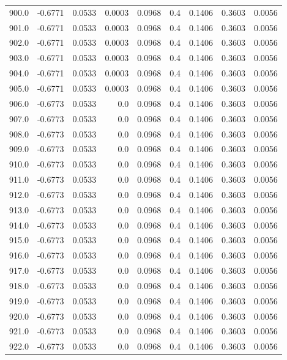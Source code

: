 \begin{longtable}{lrrrrrrrr}
900.0 & -0.6771 & 0.0533 & 0.0003 & 0.0968 & 0.4 & 0.1406 & 0.3603 & 0.0056 \\
901.0 & -0.6771 & 0.0533 & 0.0003 & 0.0968 & 0.4 & 0.1406 & 0.3603 & 0.0056 \\
902.0 & -0.6771 & 0.0533 & 0.0003 & 0.0968 & 0.4 & 0.1406 & 0.3603 & 0.0056 \\
903.0 & -0.6771 & 0.0533 & 0.0003 & 0.0968 & 0.4 & 0.1406 & 0.3603 & 0.0056 \\
904.0 & -0.6771 & 0.0533 & 0.0003 & 0.0968 & 0.4 & 0.1406 & 0.3603 & 0.0056 \\
905.0 & -0.6771 & 0.0533 & 0.0003 & 0.0968 & 0.4 & 0.1406 & 0.3603 & 0.0056 \\
906.0 & -0.6773 & 0.0533 & 0.0 & 0.0968 & 0.4 & 0.1406 & 0.3603 & 0.0056 \\
907.0 & -0.6773 & 0.0533 & 0.0 & 0.0968 & 0.4 & 0.1406 & 0.3603 & 0.0056 \\
908.0 & -0.6773 & 0.0533 & 0.0 & 0.0968 & 0.4 & 0.1406 & 0.3603 & 0.0056 \\
909.0 & -0.6773 & 0.0533 & 0.0 & 0.0968 & 0.4 & 0.1406 & 0.3603 & 0.0056 \\
910.0 & -0.6773 & 0.0533 & 0.0 & 0.0968 & 0.4 & 0.1406 & 0.3603 & 0.0056 \\
911.0 & -0.6773 & 0.0533 & 0.0 & 0.0968 & 0.4 & 0.1406 & 0.3603 & 0.0056 \\
912.0 & -0.6773 & 0.0533 & 0.0 & 0.0968 & 0.4 & 0.1406 & 0.3603 & 0.0056 \\
913.0 & -0.6773 & 0.0533 & 0.0 & 0.0968 & 0.4 & 0.1406 & 0.3603 & 0.0056 \\
914.0 & -0.6773 & 0.0533 & 0.0 & 0.0968 & 0.4 & 0.1406 & 0.3603 & 0.0056 \\
915.0 & -0.6773 & 0.0533 & 0.0 & 0.0968 & 0.4 & 0.1406 & 0.3603 & 0.0056 \\
916.0 & -0.6773 & 0.0533 & 0.0 & 0.0968 & 0.4 & 0.1406 & 0.3603 & 0.0056 \\
917.0 & -0.6773 & 0.0533 & 0.0 & 0.0968 & 0.4 & 0.1406 & 0.3603 & 0.0056 \\
918.0 & -0.6773 & 0.0533 & 0.0 & 0.0968 & 0.4 & 0.1406 & 0.3603 & 0.0056 \\
919.0 & -0.6773 & 0.0533 & 0.0 & 0.0968 & 0.4 & 0.1406 & 0.3603 & 0.0056 \\
920.0 & -0.6773 & 0.0533 & 0.0 & 0.0968 & 0.4 & 0.1406 & 0.3603 & 0.0056 \\
921.0 & -0.6773 & 0.0533 & 0.0 & 0.0968 & 0.4 & 0.1406 & 0.3603 & 0.0056 \\
922.0 & -0.6773 & 0.0533 & 0.0 & 0.0968 & 0.4 & 0.1406 & 0.3603 & 0.0056 \\

\end{longtable}
